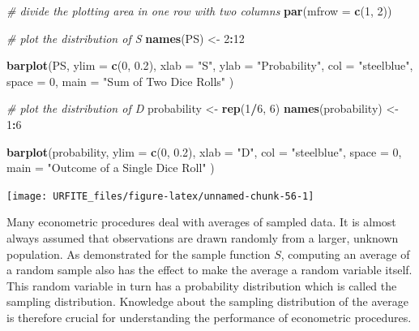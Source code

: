 \documentclass[]{book}
\newenvironment{Shaded}{\begin{snugshade}}{\end{snugshade}}
\newcommand{\KeywordTok}[1]{\textcolor[rgb]{0.13,0.29,0.53}{\textbf{#1}}}
\newcommand{\DataTypeTok}[1]{\textcolor[rgb]{0.13,0.29,0.53}{#1}}
\newcommand{\DecValTok}[1]{\textcolor[rgb]{0.00,0.00,0.81}{#1}}
\newcommand{\FloatTok}[1]{\textcolor[rgb]{0.00,0.00,0.81}{#1}}
\newcommand{\StringTok}[1]{\textcolor[rgb]{0.31,0.60,0.02}{#1}}
\newcommand{\CommentTok}[1]{\textcolor[rgb]{0.56,0.35,0.01}{\textit{#1}}}
\newcommand{\OperatorTok}[1]{\textcolor[rgb]{0.81,0.36,0.00}{\textbf{#1}}}
\newcommand{\NormalTok}[1]{#1}
\theoremstyle{definition}
\theoremstyle{definition}
\theoremstyle{definition}
\theoremstyle{remark}
\begin{document}
\begin{Shaded}
\begin{Highlighting}[]
\CommentTok{# divide the plotting area in one row with two columns}
\KeywordTok{par}\NormalTok{(}\DataTypeTok{mfrow =} \KeywordTok{c}\NormalTok{(}\DecValTok{1}\NormalTok{, }\DecValTok{2}\NormalTok{))}

\CommentTok{# plot the distribution of S}
\KeywordTok{names}\NormalTok{(PS) <-}\StringTok{ }\DecValTok{2}\OperatorTok{:}\DecValTok{12}

\KeywordTok{barplot}\NormalTok{(PS, }\DataTypeTok{ylim =} \KeywordTok{c}\NormalTok{(}\DecValTok{0}\NormalTok{, }\FloatTok{0.2}\NormalTok{), }
        \DataTypeTok{xlab =} \StringTok{"S"}\NormalTok{, }
        \DataTypeTok{ylab =} \StringTok{"Probability"}\NormalTok{, }
        \DataTypeTok{col =} \StringTok{"steelblue"}\NormalTok{, }
        \DataTypeTok{space =} \DecValTok{0}\NormalTok{, }
        \DataTypeTok{main =} \StringTok{"Sum of Two Dice Rolls"}
\NormalTok{        )}

\CommentTok{# plot the distribution of D }
\NormalTok{probability <-}\StringTok{ }\KeywordTok{rep}\NormalTok{(}\DecValTok{1}\OperatorTok{/}\DecValTok{6}\NormalTok{, }\DecValTok{6}\NormalTok{)}
\KeywordTok{names}\NormalTok{(probability) <-}\StringTok{ }\DecValTok{1}\OperatorTok{:}\DecValTok{6}

\KeywordTok{barplot}\NormalTok{(probability, }
        \DataTypeTok{ylim =} \KeywordTok{c}\NormalTok{(}\DecValTok{0}\NormalTok{, }\FloatTok{0.2}\NormalTok{), }
        \DataTypeTok{xlab =} \StringTok{"D"}\NormalTok{, }
        \DataTypeTok{col =} \StringTok{"steelblue"}\NormalTok{, }
        \DataTypeTok{space =} \DecValTok{0}\NormalTok{, }
        \DataTypeTok{main =} \StringTok{"Outcome of a Single Dice Roll"}
\NormalTok{        )}
\end{Highlighting}
\end{Shaded}

\begin{center}\texttt{[image: URFITE\_files/figure-latex/unnamed-chunk-56-1]} \end{center}

Many econometric procedures deal with averages of sampled data. It is
almost always assumed that observations are drawn randomly from a
larger, unknown population. As demonstrated for the sample function
\(S\), computing an average of a random sample also has the effect to
make the average a random variable itself. This random variable in turn
has a probability distribution which is called the sampling
distribution. Knowledge about the sampling distribution of the average
is therefore crucial for understanding the performance of econometric
procedures.
\end{document}
